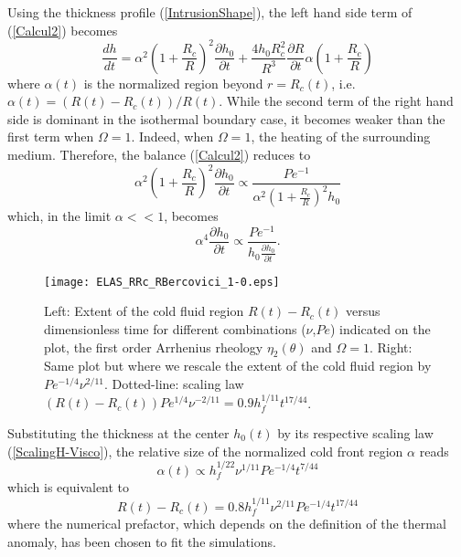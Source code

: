 Using the thickness profile (\ref{IntrusionShape}), the left hand side
term of (\ref{Calcul2}) becomes
\begin{equation}
  \frac{d h}{d t} = \alpha^2\left(1+\frac{R_c}{R}\right)^2\frac{\partial h_0}{\partial
    t}+\frac{4h_0R_c^2}{R^3}\frac{\partial
    R}{\partial
    t}\alpha\left(1+\frac{R_c}{R}\right) 
\end{equation}
where  $\alpha  (t)$  is  the  normalized  region  beyond  $r=R_c(t)$,
i.e. $\alpha(t)= \left(R(t)-R_c(t)\right)/R(t)$. While the second term
of the right hand side is dominant in the isothermal boundary case, it
becomes  weaker than  the  first term  when  $\Omega=1$. Indeed,  when
$\Omega=1$,  the heating  of  the surrounding  medium. Therefore,  the
balance (\ref{Calcul2}) reduces to
\begin{equation}
  \alpha^2\left(1+\frac{R_c}{R}\right)^2\frac{\partial h_0}{\partial
    t}\propto \frac{Pe^{-1}}{\alpha^2\left(1+\frac{R_c}{R}\right)^2h_0}
\end{equation}
which, in the limit $\alpha<<1$, becomes
\begin{equation}
  \alpha^4\frac{\partial h_0}{\partial
    t} \propto \frac{Pe^{-1}}{h_0\frac{\partial h_0}{\partial t}}.
\end{equation}
\begin{figure}
  \begin{center}
    \graphicspath{ {/Users/thorey/Documents/These/Projet/Refroidissement/Skin_Model/Figure/Figure_Heating/} }
    \texttt{[image: ELAS\_RRc\_RBercovici\_1-0.eps]}
    \caption{Left:  Extent  of  the cold  fluid  region  $R(t)-R_c(t)$
      versus   dimensionless    time   for    different   combinations
      ($\nu$,$Pe$) indicated  on the  plot, the first  order Arrhenius
      rheology $\eta_2(\theta)$ and $\Omega=1$.   Right: Same plot but
      where  we  rescale  the  extent  of the  cold  fluid  region  by
      $Pe^{-1/4}\nu^{2/11}$.       Dotted-line:       scaling      law
      $(R(t)-R_c(t))Pe^{1/4}\nu^{-2/11}= 0.9 h_f^{1/11}t^{17/44}$.}
    \label{ELAS_RRc_RBercovici_1-0}
  \end{center}
\end{figure}

Substituting the  thickness at the  center $h_0(t)$ by  its respective
scaling  law   (\ref{ScalingH-Visco}),  the   relative  size   of  the
normalized cold front region $\alpha$ reads
\begin{equation}
  \alpha(t) \propto h_f^{1/22}\nu^{1/11}Pe^{-1/4}t^{7/44}
\end{equation}
which is equivalent to
\begin{equation}
  R(t)-R_c(t) = 0.8h_f^{1/11}\nu^{2/11}Pe^{-1/4}t^{17/44}
  \label{ScalingRRc-Heating}
\end{equation}
where the numerical prefactor, which  depends on the definition of the
thermal anomaly, has been chosen to fit the simulations.

